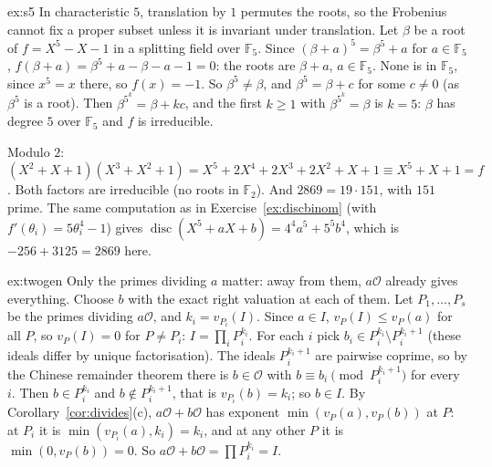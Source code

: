 \begin{solution}{ex:s5}
\idea In characteristic $5$, translation by $1$ permutes the roots, so the Frobenius cannot fix a proper subset unless it
is invariant under translation.
\writeup Let $\beta$ be a root of $f=X^5-X-1$ in a splitting field over $\mathbb F_5$. Since $(\beta+a)^5=\beta^5+a$ for
$a\in\mathbb F_5$, $f(\beta+a)=\beta^5+a-\beta-a-1=0$: the roots are $\beta+a$, $a\in\mathbb F_5$. None is in $\mathbb F_5$,
since $x^5=x$ there, so $f(x)=-1$. So $\beta^5\ne\beta$, and $\beta^5=\beta+c$ for some $c\ne0$ (as $\beta^5$ is a root).
Then $\beta^{5^k}=\beta+kc$, and the first $k\ge1$ with $\beta^{5^k}=\beta$ is $k=5$: $\beta$ has degree $5$ over
$\mathbb F_5$ and $f$ is irreducible.

Modulo $2$: $(X^2+X+1)(X^3+X^2+1)=X^5+2X^4+2X^3+2X^2+X+1\equiv X^5+X+1=f$. Both factors are irreducible (no roots in
$\mathbb F_2$). And $2869=19\cdot151$, with $151$ prime. The same computation as in Exercise~\ref{ex:discbinom} (with
$f'(\theta_i)=5\theta_i^4-1$) gives $\operatorname{disc}(X^5+aX+b)=4^4a^5+5^5b^4$, which is $-256+3125=2869$ here.
\end{solution}

\begin{solution}{ex:twogen}
\idea Only the primes dividing $a$ matter: away from them, $a\mathcal O$ already gives everything. Choose $b$ with the
exact right valuation at each of them.
\writeup Let $P_1,\dots,P_s$ be the primes dividing $a\mathcal O$, and $k_i=v_{P_i}(I)$. Since $a\in I$,
$v_P(I)\le v_P(a)$ for all $P$, so $v_P(I)=0$ for $P\ne P_i$: $I=\prod_iP_i^{k_i}$. For each $i$ pick $b_i\in
P_i^{k_i}\setminus P_i^{k_i+1}$ (these ideals differ by unique factorisation). The ideals $P_i^{k_i+1}$ are pairwise coprime,
so by the Chinese remainder theorem there is $b\in\mathcal O$ with $b\equiv b_i\pmod{P_i^{k_i+1}}$ for every $i$. Then
$b\in P_i^{k_i}$ and $b\notin P_i^{k_i+1}$, that is $v_{P_i}(b)=k_i$; so $b\in I$. By Corollary~\ref{cor:divides}(c),
$a\mathcal O+b\mathcal O$ has exponent $\min(v_P(a),v_P(b))$ at $P$: at $P_i$ it is $\min(v_{P_i}(a),k_i)=k_i$, and at
any other $P$ it is $\min(0,v_P(b))=0$. So $a\mathcal O+b\mathcal O=\prod P_i^{k_i}=I$.
\end{solution}

